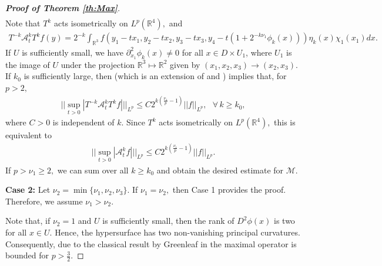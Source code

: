 \documentclass[a4paper, 11pt]{article}
\theoremstyle{plain}
\theoremstyle{definition}
\theoremstyle{lemma}
\theoremstyle{Remark}
\theoremstyle{proposition}
\theoremstyle{corollary}
\theoremstyle{example}
\theoremstyle{assumption}
\begin{document}
\begin{proof}[\textbf{Proof of Theorem \ref{th:Max}}]
\begin{eqnarray*}
\end{eqnarray*}
Note that $T^k$ acts isometrically on $L^p(\mathbb{R}^4),$ and
\begin{eqnarray*}
T^{-k} \mathcal{A}_t^k T^kf(y)=2^{-k}\int_{\mathbb{R}^3}f(y_1-tx_1,y_2-tx_2,y_3-tx_3, y_4-t(1+ 2^{-k\nu_1}\phi_k(x))) \eta_k(x)\chi_1(x_1)dx.
\end{eqnarray*}
If $U$ is sufficiently small, we have
$\partial_{x_1}^{2} \phi_k(x) \neq 0$
for all $x \in D \times U_1$, where $U_1$ is the image of $U$ under the projection $\mathbb{R}^3\mapsto \mathbb{R}^2$ given by $(x_1, x_2, x_3)\to (x_2, x_3)$.
 If $k_0$ is sufficiently large,  then \cite[Theorem 7.1]{I.U} (which is an extension of \cite{Sogge} and \cite[Proposition 4.5]{I.K.M}) implies that, for $p>2,$
\begin{eqnarray*}
\big|\big|\sup_{t>0}|T^{-k} \mathcal{A}_t^k T^kf|\big|\big|_{L^p}\leq C 2^{k\left(\frac{\nu_1}{ p}-1\right)}||f||_{L^p},\,\,\,\,\forall\,k\geq k_0,
\end{eqnarray*}
where $C>0$ is independent of $k$. Since $T^k$ acts isometrically on $L^p(\mathbb{R}^4),$ this is equivalent to
\begin{eqnarray*}
\big|\big|\sup_{t>0}| \mathcal{A}_t^k f|\big|\big|_{L^p}\leq C 2^{k\left(\frac{\nu_1}{ p}-1\right)}||f||_{L^p}.
\end{eqnarray*}
If $p>\nu_1\geq 2,$   we can sum over all $k\geq k_0$ and obtain the desired estimate for $\mathcal{M}.$


\textbf{Case 2:}  Let $\nu_2= \min\{\nu_1,\nu_2,\nu_3\}.$ If $\nu_1=\nu_2, $ then Case 1 provides the proof. Therefore, we assume $\nu_1>\nu_2.$

 Note that, if $\nu_2=1$ and $U$ is sufficiently small,  then the rank of $D^2 \phi(x)$ is two for all $x\in U.$ Hence,   the hypersurface has two non-vanishing principal curvatures. Consequently, due to the classical result by Greenleaf in \cite{Gr} the maximal operator is bounded for $p>\frac{3}{2}$.



\end{proof}
\end{document}
